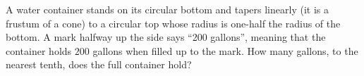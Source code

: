 A water container stands on its circular bottom and tapers linearly (it is a frustum of a cone) to a circular top whose radius is one-half the radius of the bottom. A mark halfway up the side says ``200 gallons'', meaning that the container holds $200$ gallons when filled up to the mark. How many gallons, to the nearest tenth, does the full container hold?
